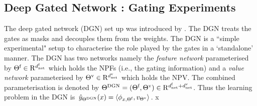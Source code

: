 \subsection{Deep Gated Network : Gating Experiments}
\FloatBarrier
\begin{figure}[h]
\end{figure}
The deep gated network (DGN) set up was introduced by \cite{npk}. The DGN treats the gates as masks and decouples them from the weights. The DGN is a ``simple experimental" setup to characterise the role played by the gates in a `standalone' manner.  
The DGN has two networks namely the \emph{feature network} parameterised by $\Theta^{\textrm{f}}\in\mathrm{R}^{d^{\text{f}}_{\text{net}}}$ which holds the NPFs (i.e., the gating information) and a \emph{value network} parameterised by ${\Theta}^{\text{v}}\in\mathrm{R}^{d^{\text{v}}_{\text{net}}}$ which holds the NPV.  The combined parameterisation is denoted by $\Theta^{\text{DGN}}=(\Theta^{\textrm{f}},{\Theta}^{\text{v}})\in \mathrm{R}^{d^{\text{f}}_{\text{net}}+d^{\text{v}}_{\text{net}}}$.  Thus the learning problem in the DGN is $\hat{y}_{\Theta^{\text{DGN}}}(x)=\langle \phi_{x,\Theta^{\textrm{f}}},v_{{\Theta}^{\text{v}}}\rangle$. 
x%

